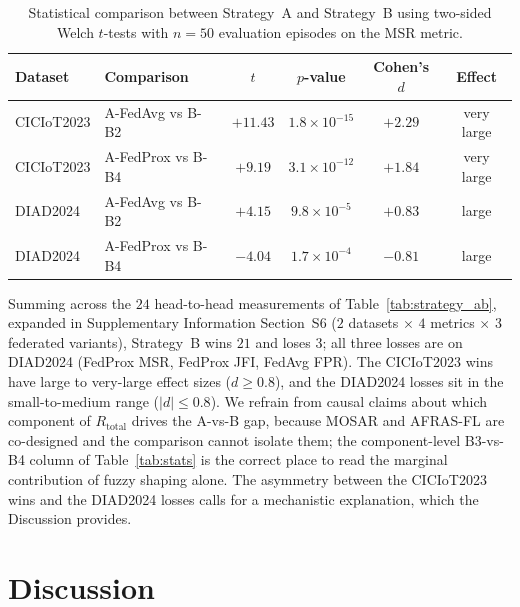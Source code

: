 \documentclass[ai,article,submit,moreauthors,pdftex]{Definitions/mdpi}
\begin{document}
\begin{table}[!htbp]
  \centering
  \caption{Statistical comparison between Strategy~A and Strategy~B
  using two-sided Welch $t$-tests with $n = 50$ evaluation episodes on
  the MSR metric.}\label{tab:strategy_ab_stats}
  \small
  \begin{tabular}{@{}llcccc@{}}
    \toprule
    \textbf{Dataset} & \textbf{Comparison} & $t$ & $p$-value & \textbf{Cohen's $d$} & \textbf{Effect} \\
    \midrule
    CICIoT2023 & A-FedAvg  vs B-B2 & $+11.43$ & $1.8{\times}10^{-15}$ & $+2.29$ & very large \\
    CICIoT2023 & A-FedProx vs B-B4 & $+9.19$  & $3.1{\times}10^{-12}$ & $+1.84$ & very large \\
    DIAD2024   & A-FedAvg  vs B-B2 & $+4.15$  & $9.8{\times}10^{-5}$  & $+0.83$ & large \\
    DIAD2024   & A-FedProx vs B-B4 & $-4.04$  & $1.7{\times}10^{-4}$  & $-0.81$ & large \\
    \bottomrule
  \end{tabular}
\end{table}

Summing across the $24$ head-to-head measurements of
Table~\ref{tab:strategy_ab}, expanded in Supplementary Information
Section~S6 ($2$ datasets $\times$ $4$ metrics $\times$ $3$ federated
variants), Strategy~B wins $21$ and loses $3$; all three losses are
on DIAD2024 (FedProx MSR, FedProx JFI, FedAvg FPR). The CICIoT2023
wins have large to very-large effect sizes ($d \ge 0.8$), and the
DIAD2024 losses sit in the small-to-medium range ($|d| \le 0.8$). We
refrain from causal claims about which component of $R_{\text{total}}$
drives the A-vs-B gap, because MOSAR and AFRAS-FL are co-designed
and the comparison cannot isolate them; the component-level B3-vs-B4
column of Table~\ref{tab:stats} is the correct place to read the
marginal contribution of fuzzy shaping alone. The asymmetry between
the CICIoT2023 wins and the DIAD2024 losses calls for a mechanistic
explanation, which the Discussion provides.


\section{Discussion}\label{sec:discussion}
\end{document}
